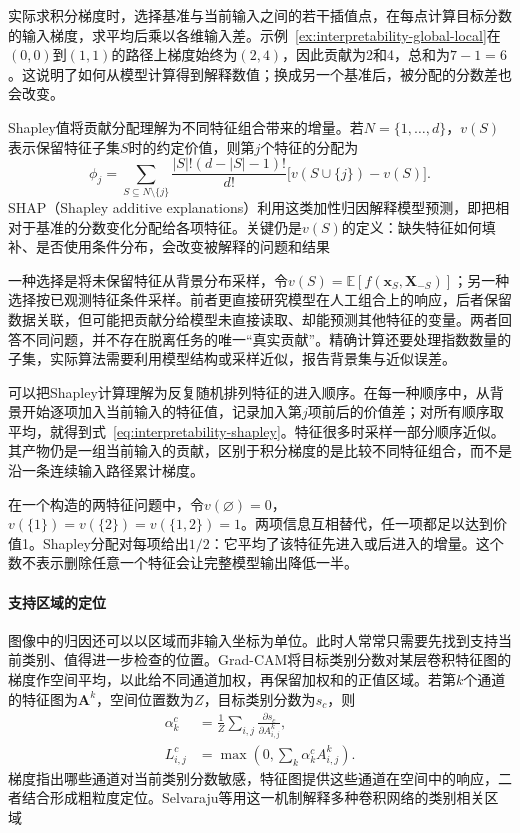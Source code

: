 实际求积分梯度时，选择基准与当前输入之间的若干插值点，在每点计算目标分数的输入梯度，求平均后乘以各维输入差。示例~\ref{ex:interpretability-global-local}在$(0,0)$到$(1,1)$的路径上梯度始终为$(2,4)$，因此贡献为2和4，总和为$7-1=6$。这说明了如何从模型计算得到解释数值；换成另一个基准后，被分配的分数差也会改变。

Shapley值将贡献分配理解为不同特征组合带来的增量。若$N=\{1,\ldots,d\}$，$v(S)$表示保留特征子集$S$时的约定价值，则第$j$个特征的分配为
\begin{equation}
 \phi_j=\sum_{S\subseteq N\setminus\{j\}}
 \frac{|S|!(d-|S|-1)!}{d!}
 \bigl[v(S\cup\{j\})-v(S)\bigr].
 \label{eq:interpretability-shapley}
\end{equation}
SHAP（Shapley additive explanations）利用这类加性归因解释模型预测，即把相对于基准的分数变化分配给各项特征。关键仍是$v(S)$的定义：缺失特征如何填补、是否使用条件分布，会改变被解释的问题和结果

一种选择是将未保留特征从背景分布采样，令$v(S)=\mathbb E[f(\bm{x}_S,\bm{X}_{-S})]$；另一种选择按已观测特征条件采样。前者更直接研究模型在人工组合上的响应，后者保留数据关联，但可能把贡献分给模型未直接读取、却能预测其他特征的变量。两者回答不同问题，并不存在脱离任务的唯一“真实贡献”。精确计算还要处理指数数量的子集，实际算法需要利用模型结构或采样近似，报告背景集与近似误差。

可以把Shapley计算理解为反复随机排列特征的进入顺序。在每一种顺序中，从背景开始逐项加入当前输入的特征值，记录加入第$j$项前后的价值差；对所有顺序取平均，就得到式~\eqref{eq:interpretability-shapley}。特征很多时采样一部分顺序近似。其产物仍是一组当前输入的贡献，区别于积分梯度的是比较不同特征组合，而不是沿一条连续输入路径累计梯度。

\begin{example}[共同信息的贡献分配]
\label{ex:interpretability-redundancy}
在一个构造的两特征问题中，令$v(\varnothing)=0$，$v(\{1\})=v(\{2\})=v(\{1,2\})=1$。两项信息互相替代，任一项都足以达到价值1。Shapley分配对每项给出$1/2$：它平均了该特征先进入或后进入的增量。这个数不表示删除任意一个特征会让完整模型输出降低一半。
\end{example}

\paragraph{支持区域的定位}

图像中的归因还可以以区域而非输入坐标为单位。此时人常常只需要先找到支持当前类别、值得进一步检查的位置。Grad-CAM将目标类别分数对某层卷积特征图的梯度作空间平均，以此给不同通道加权，再保留加权和的正值区域。若第$k$个通道的特征图为$\bm A^k$，空间位置数为$Z$，目标类别分数为$s_c$，则
\begin{equation}
 \begin{aligned}
 \alpha_k^c&=\frac{1}{Z}\sum_{i,j}
 \frac{\partial s_c}{\partial A^k_{i,j}},\\
 L^c_{i,j}&=\max\!\left(0,\sum_k\alpha_k^c A^k_{i,j}\right).
 \end{aligned}
 \label{eq:interpretability-gradcam}
\end{equation}
梯度指出哪些通道对当前类别分数敏感，特征图提供这些通道在空间中的响应，二者结合形成粗粒度定位。Selvaraju等用这一机制解释多种卷积网络的类别相关区域

